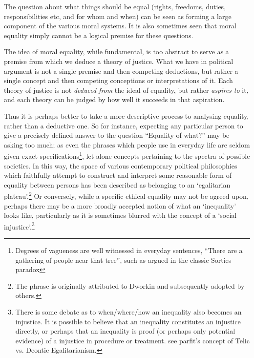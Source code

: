 The question about what things should be equal (rights, freedoms, duties, responsibilities etc, and for whom and when) can be seen as forming a large component of the various moral systems.
It is also sometimes seen that moral equality simply cannot be a logical premise for these questions.

\begin{displayquote}
The idea of moral equality, while fundamental, is too abstract to serve as a premise from which we deduce a theory of justice. What we have in political argument is not a single premise and then competing deductions, but rather a single concept and then competing conceptions or interpretations of it. Each theory of justice is not \textit{deduced from} the ideal of equality, but rather \textit{aspires to} it, and each theory can be judged by how well it succeeds in that aspiration.\cite{kymlicka2002contemporary}
\end{displayquote}

Thus it is perhaps better to take a more descriptive process to analysing equality, rather than a deductive one.
So for instance, expecting any particular person to give a precisely defined answer to the question ``Equality of what?'' may be asking too much; as even the phrases which people use in everyday life are seldom given exact specifications\footnote{Degrees of vagueness are well witnessed in everyday sentences, ``There are a gathering of people near that tree'', such as argued in the classic Sorties paradox\cite{frances_2018}}, let alone concepts pertaining to the spectra of possible societies.
In this way, the space of various contemporary political philosophies which faithfully attempt to construct and interpret some reasonable form of equality between persons has been described as belonging to an `egalitarian plateau'.\footnote{The phrase is originally attributed to Dworkin and subsequently adopted by others.}\cite{Brown2007}
Or conversely, while a specific ethical equality may not be agreed upon, perhaps there may be a more broadly accepted notion of what an `inequality' looks like,
particularly as it is sometimes blurred with the concept of a `social injustice'.\footnote{There is some debate as to when/where/how an inequality also becomes an injustice. It is possible to believe that an inequality constitutes an injustice directly, or perhaps that an inequality is proof (or perhaps only potential evidence) of a injustice in procedure or treatment. see parfit's concept of Telic vs. Deontic Egalitarianism.\cite{equalityandpriorityparfit}}

